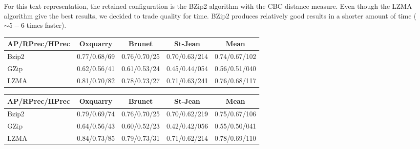 For this text representation, the retained configuration is the BZip2 algorithm with the CBC distance measure.
Even though the LZMA algorithm give the best results, we decided to trade quality for time.
BZip2 produces relatively good results in a shorter amount of time ($\sim 5-6$ times faster).

\begin{table*}
  \centering
  \caption{Compression methods evaluation with different compression algorithm and distance metrics}
  \label{tab:compression_evaluation_results}

  \begin{tabular}{l c c c|c}
    \toprule
    AP/RPrec/HPrec & Oxquarry     & Brunet       & St-Jean       & Mean \\
    \midrule
    Bzip2          & 0.77/0.68/69 & 0.76/0.70/25 & 0.70/0.63/214 & 0.74/0.67/102\\
    GZip           & 0.62/0.56/41 & 0.61/0.53/24 & 0.45/0.44/054 & 0.56/0.51/040\\
    LZMA           & 0.81/0.70/82 & 0.78/0.73/27 & 0.71/0.63/241 & 0.76/0.68/117\\
    \bottomrule
  \end{tabular}

  \vspace{0.5cm}

  \begin{tabular}{l c c c|c}
    \toprule
    AP/RPrec/HPrec & Oxquarry     & Brunet       & St-Jean       & Mean\\
    \midrule
    Bzip2          & 0.79/0.69/74 & 0.76/0.70/25 & 0.70/0.62/219 & 0.75/0.67/106\\
    GZip           & 0.64/0.56/43 & 0.60/0.52/23 & 0.42/0.42/056 & 0.55/0.50/041\\
    LZMA           & 0.84/0.73/85 & 0.79/0.73/31 & 0.71/0.62/214 & 0.78/0.69/110\\
    \bottomrule
  \end{tabular}

\end{table*}

